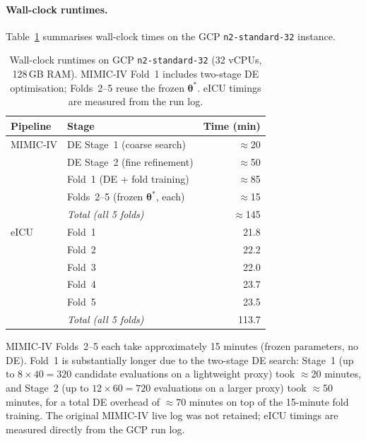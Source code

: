 \documentclass[a4paper,fleqn,longmktitle]{cas-sc}
\begin{document}
	\paragraph{Wall-clock runtimes.}
	Table~\ref{tab:runtimes} summarises wall-clock times on the
	GCP \texttt{n2-standard-32} instance.
	\FloatBarrier
	\begin{table}[ht]
		\centering
		\caption{Wall-clock runtimes on GCP \texttt{n2-standard-32}
			(32 vCPUs, 128\,GB RAM).
			MIMIC-IV Fold~1 includes two-stage DE optimisation;
			Folds~2--5 reuse the frozen $\boldsymbol{\theta}^*$.
			eICU timings are measured from the run log.}
		\label{tab:runtimes}
		\small
		\begin{tabular}{llr}
			\toprule
			\textbf{Pipeline} & \textbf{Stage} & \textbf{Time (min)} \\
			\midrule
			MIMIC-IV & DE Stage~1 (coarse search) & $\approx$20 \\
			         & DE Stage~2 (fine refinement) & $\approx$50 \\
			         & Fold~1 (DE + fold training) & $\approx$85 \\
			         & Folds~2--5 (frozen $\boldsymbol{\theta}^*$, each) & $\approx$15 \\
			         & \textit{Total (all 5 folds)} & $\approx$145 \\
			\midrule
			eICU     & Fold~1 & 21.8 \\
			         & Fold~2 & 22.2 \\
			         & Fold~3 & 22.0 \\
			         & Fold~4 & 23.7 \\
			         & Fold~5 & 23.5 \\
			         & \textit{Total (all 5 folds)} & 113.7 \\
			\bottomrule
		\end{tabular}
	\end{table}
	\FloatBarrier
	MIMIC-IV Folds~2--5 each take approximately 15 minutes
	(frozen parameters, no DE).
	Fold~1 is substantially longer due to the two-stage DE search:
	Stage~1 (up to $8 \times 40 = 320$ candidate evaluations on a
	lightweight proxy) took $\approx$20 minutes, and Stage~2
	(up to $12 \times 60 = 720$ evaluations on a larger proxy)
	took $\approx$50 minutes, for a total DE overhead of
	$\approx$70 minutes on top of the 15-minute fold training.
	The original MIMIC-IV live log was not retained;
	eICU timings are measured directly from the GCP run log.
\end{document}
